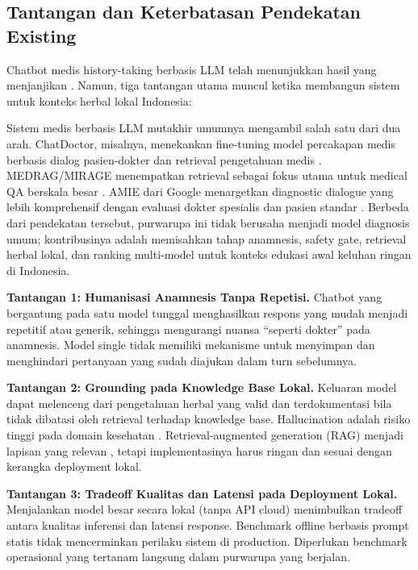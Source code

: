 \documentclass[conference]{IEEEtran}
\begin{document}
\subsection{Tantangan dan Keterbatasan Pendekatan Existing}
Chatbot medis history-taking berbasis LLM telah menunjukkan hasil yang menjanjikan \cite{b4}. Namun, tiga tantangan utama muncul ketika membangun sistem untuk konteks herbal lokal Indonesia:

Sistem medis berbasis LLM mutakhir umumnya mengambil salah satu dari dua arah. ChatDoctor, misalnya, menekankan fine-tuning model percakapan medis berbasis dialog pasien-dokter dan retrieval pengetahuan medis \cite{b20}. MEDRAG/MIRAGE menempatkan retrieval sebagai fokus utama untuk medical QA berskala besar \cite{b21}. AMIE dari Google menargetkan diagnostic dialogue yang lebih komprehensif dengan evaluasi dokter spesialis dan pasien standar \cite{b22}. Berbeda dari pendekatan tersebut, purwarupa ini tidak berusaha menjadi model diagnosis umum; kontribusinya adalah memisahkan tahap anamnesis, safety gate, retrieval herbal lokal, dan ranking multi-model untuk konteks edukasi awal keluhan ringan di Indonesia.

\textbf{Tantangan 1: Humanisasi Anamnesis Tanpa Repetisi.} Chatbot yang bergantung pada satu model tunggal menghasilkan respons yang mudah menjadi repetitif atau generik, sehingga mengurangi nuansa ``seperti dokter'' pada anamnesis. Model single tidak memiliki mekanisme untuk menyimpan dan menghindari pertanyaan yang sudah diajukan dalam turn sebelumnya.

\textbf{Tantangan 2: Grounding pada Knowledge Base Lokal.} Keluaran model dapat melenceng dari pengetahuan herbal yang valid dan terdokumentasi bila tidak dibatasi oleh retrieval terhadap knowledge base. Hallucination adalah risiko tinggi pada domain kesehatan \cite{b6}. Retrieval-augmented generation (RAG) menjadi lapisan yang relevan \cite{b5}, tetapi implementasinya harus ringan dan sesuai dengan kerangka deployment lokal.

\textbf{Tantangan 3: Tradeoff Kualitas dan Latensi pada Deployment Lokal.} Menjalankan model besar secara lokal (tanpa API cloud) menimbulkan tradeoff antara kualitas inferensi dan latensi response. Benchmark offline berbasis prompt statis tidak mencerminkan perilaku sistem di production. Diperlukan benchmark operasional yang tertanam langsung dalam purwarupa yang berjalan.
\end{document}
